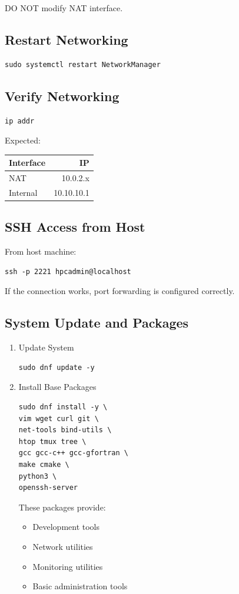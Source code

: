 \documentclass[11pt]{article}
\begin{document}
DO NOT modify NAT interface.
\subsection{Restart Networking}
\label{sec:orgd4b76ce}

\begin{verbatim}
sudo systemctl restart NetworkManager
\end{verbatim}
\subsection{Verify Networking}
\label{sec:org8e49e33}

\begin{verbatim}
ip addr
\end{verbatim}

Expected:

\begin{center}
\begin{tabular}{lr}
Interface & IP\\
\hline
NAT & 10.0.2.x\\
Internal & 10.10.10.1\\
\end{tabular}
\end{center}
\subsection{SSH Access from Host}
\label{sec:org7e134aa}

From host machine:

\begin{verbatim}
ssh -p 2221 hpcadmin@localhost
\end{verbatim}
If the connection works, port forwarding is configured correctly.
\subsection{System Update and Packages}
\label{sec:org65143c5}
\begin{enumerate}
\item Update System
\label{sec:org5cd8012}

\begin{verbatim}
sudo dnf update -y
\end{verbatim}
\item Install Base Packages
\label{sec:orgcc913c3}

\begin{verbatim}
sudo dnf install -y \
vim wget curl git \
net-tools bind-utils \
htop tmux tree \
gcc gcc-c++ gcc-gfortran \
make cmake \
python3 \
openssh-server
\end{verbatim}

These packages provide:

\begin{itemize}
\item Development tools
\item Network utilities
\item Monitoring utilities
\item Basic administration tools
\end{itemize}
\end{enumerate}
\end{document}
